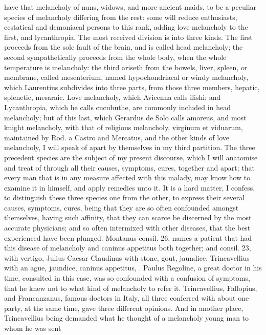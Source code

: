 {have that melancholy of nuns, widows, and more ancient maids, to be a
peculiar species of melancholy differing from the rest: some will
reduce enthusiasts, ecstatical and demoniacal persons to this rank,
adding  love melancholy to the first, and lycanthropia. The most
received division is into three kinds. The first proceeds from the sole
fault of the brain, and is called head melancholy; the second
sympathetically proceeds from the whole body, when the whole
temperature is melancholy: the third ariseth from the bowels, liver,
spleen, or membrane, called mesenterium, named hypochondriacal or windy
melancholy, which Laurentius subdivides into three parts, from
those three members, hepatic, splenetic, mesaraic. Love melancholy,
which Avicenna calls ilishi: and Lycanthropia, which he calls
cucubuthe, are commonly included in head melancholy; but of this last,
which Gerardus de Solo calls amoreus, and most knight melancholy, with
that of religious melancholy, virginum et viduarum, maintained by Rod.
a Castro and Mercatus, and the other kinds of love melancholy, I will
speak of apart by themselves in my third partition. The three precedent
species are the subject of my present discourse, which I will anatomise
and treat of through all their causes, symptoms, cures, together and
apart; that every man that is in any measure affected with this malady,
may know how to examine it in himself, and apply remedies unto it.
It is a hard matter, I confess, to distinguish these three species one
from the other, to express their several causes, symptoms, cures, being
that they are so often confounded amongst themselves, having such
affinity, that they can scarce be discerned by the most accurate
physicians; and so often intermixed with other diseases, that the best
experienced have been plunged. Montanus consil. 26, names a patient
that had this disease of melancholy and caninus appetitus both
together; and consil. 23, with vertigo, Julius Caesar Claudinus
with stone, gout, jaundice. Trincavellius with an ague, jaundice,
caninus appetitus, \etc{}. Paulus Regoline, a great doctor in his
time, consulted in this case, was so confounded with a confusion of
symptoms, that he knew not to what kind of melancholy to refer it.
Trincavellius, Fallopius, and Francanzanus, famous doctors in
Italy, all three conferred with about one party, at the same time, gave
three different opinions. And in another place, Trincavellius being
demanded what he thought of a melancholy young man to whom he was sent
}
